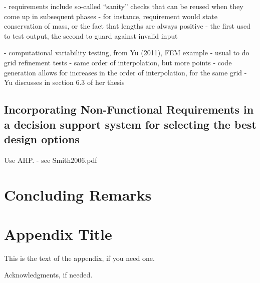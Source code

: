 \documentclass[10pt, preprint]{sigplanconf}
\begin{document}
- requirements include so-called “sanity” checks that can be reused when they come up in subsequent phases
- for instance, requirement would state conservation of mass, or the fact that lengths are always positive - the first used to test output, the second to guard against invalid input

- computational variability testing, from Yu (2011), FEM example
- usual to do grid refinement tests - same order of interpolation, but more points
- code generation allows for increases in the order of interpolation, for the same grid
- Yu discusses in section 6.3 of her thesis

\subsection{Incorporating Non-Functional Requirements in a decision support system for selecting the best design options}
\label{subsec:incorporating}

Use AHP. - see Smith2006.pdf

\section{Concluding Remarks}
\label{sec:concluding}

\appendix
\section{Appendix Title}

This is the text of the appendix, if you need one.

\acks

Acknowledgments, if needed.





\begin{thebibliography}{}
\softraggedright


\end{thebibliography}
\end{document}
